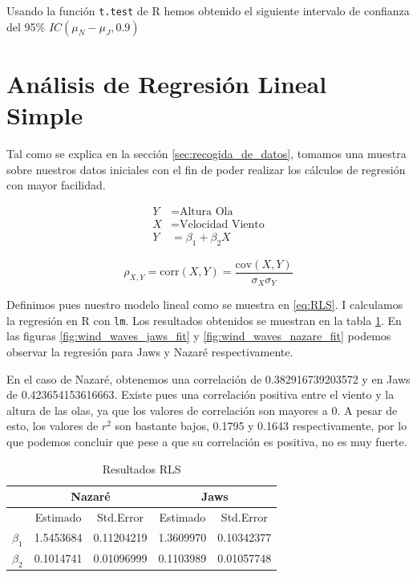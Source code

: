 Usando la función \texttt{t.test} de R hemos obtenido el siguiente intervalo de confianza del 95\% \(IC\left( \mu_N - \mu_J, 0.9\right)\)

\section{Análisis de Regresión Lineal Simple}
\label{sec:rls}

Tal como se explica en la sección \ref{sec:recogida_de_datos}, tomamos una muestra sobre nuestros datos
iniciales con el fin de poder realizar los cálculos de regresión con mayor facilidad. %

\begin{align}
\label{eq:RLS}
    Y &= \text{Altura Ola}     \nonumber \\
    X &= \text{Velocidad Viento}     \nonumber \\
    Y &= \beta_1 + \beta_2 X 
\end{align}

\begin{equation}
\label{eq:correlation}
    \rho_{X,Y}=\mathrm{corr}(X,Y) = \frac{\mathrm{cov}(X,Y)}{\sigma_X \sigma_Y}
\end{equation}

Definimos pues nuestro modelo lineal como se muestra en \ref{eq:RLS}. I calculamos la regresión en R con
\texttt{lm}. Los resultados obtenidos se muestran en la tabla \ref{tab:results_RLS}.
En las figuras \ref{fig:wind_waves_jaws_fit} y \ref{fig:wind_waves_nazare_fit} podemos observar la
regresión para Jaws y Nazaré respectivamente.

En el caso de Nazaré, obtenemos una correlación de 0.382916739203572 y en Jaws de 0.423654153616663. Existe
pues una correlación positiva entre el viento y la altura de las olas, ya que los valores de
correlación son mayores a 0. A pesar de esto, los valores de \(r^2\) son bastante bajos, 0.1795 y 0.1643 respectivamente, por lo que podemos concluir que pese a que su correlación es positiva, no es muy fuerte.

\begin{table}[htbp]
    \centering
    \begin{tabular}{lcc|cc}
        \toprule
        & \multicolumn{2}{c}{Nazaré} & \multicolumn{2}{c}{Jaws} \\
        \midrule
        & Estimado & Std.Error & Estimado & Std.Error \\
        \midrule
        \(\beta_1\)     & 1.5453684 & 0.11204219  &  1.3609970 & 0.10342377  \\
        \(\beta_2\)     & 0.1014741 & 0.01096999  &  0.1103989 & 0.01057748 \\
        \bottomrule
    \end{tabular}
    \caption{Resultados RLS}
    \label{tab:results_RLS}
\end{table}

